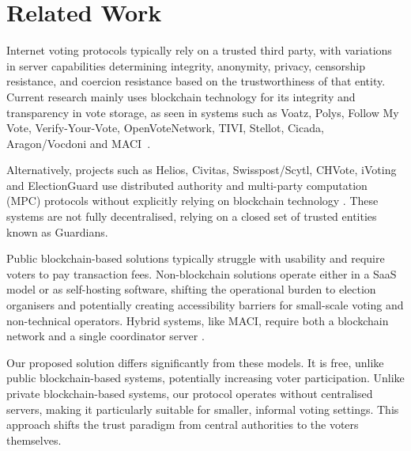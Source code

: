 \documentclass[runningheads]{llncs}
\begin{document}
\section{Related Work}
Internet voting protocols typically rely on a trusted third party, with variations in server capabilities determining integrity, anonymity, privacy, censorship resistance, and coercion resistance based on the trustworthiness of that entity. Current research mainly uses blockchain technology for its integrity and transparency in vote storage, as seen in systems such as Voatz, Polys, Follow My Vote, Verify-Your-Vote, OpenVoteNetwork, TIVI, Stellot, Cicada, Aragon/Vocdoni and MACI~\cite{mooreWestVirginiaMobile2019, PolysOnlineVoting, SecureDecentralizedApplication2023, chaiebVerifyYourVoteVerifiableBlockchainBased2019, haoAnonymousVotingTworound2010, mccorrySmartContractBoardroom2017, seifelnasrScalableOpenVoteNetwork2020, elsheikhDisputefreeScalableOpen2022, TIVIPoweredSmartmatic, NowYouCan2016, baranskiPracticalIVotingStellar2020, BuildingCicadaPrivate, A16zCicada2023, ethereumfoundationMinimalAntiCollusionInfrastructure2022, VocdoniIntroductionVocdoni, PrivacyscalingexplorationsMaci2023}.

Alternatively, projects such as Helios, Civitas, Swisspost/Scytl, CHVote, iVoting and ElectionGuard use distributed authority and multi-party computation (MPC) protocols without explicitly relying on blockchain technology \cite{adidaHeliosWebbasedOpenAudit2008, clarksonCivitasSecureVoting2008, 
CHVoteProjectRelease,roenneJCJImprovedVerifiability2016, benalohElectionGuardDesignSpecification2023}. These systems are not fully decentralised, relying on a closed set of trusted entities known as Guardians.

Public blockchain-based solutions typically struggle with usability and require voters to pay transaction fees. Non-blockchain solutions operate either in a SaaS model or as self-hosting software, shifting the operational burden to election organisers and potentially creating accessibility barriers for small-scale voting and non-technical operators. Hybrid systems, like MACI, require both a blockchain network and a single coordinator server \cite{ethereumfoundationMinimalAntiCollusionInfrastructure2022, PrivacyscalingexplorationsMaci2023}.

Our proposed solution differs significantly from these models. It is free, unlike public blockchain-based systems, potentially increasing voter participation. Unlike private blockchain-based systems, our protocol operates without centralised servers, making it particularly suitable for smaller, informal voting settings. This approach shifts the trust paradigm from central authorities to the voters themselves.
\end{document}
